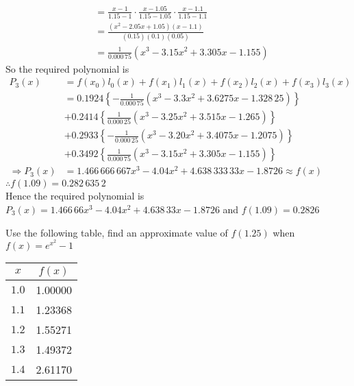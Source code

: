 \documentclass[12pt,class=book,crop=false]{standalone}
\begin{document}
\begin{soln}
\begin{align*}
               & = \frac{x-1}{1.15-1}\cdot\frac{x-1.05}{1.15-1.05}\cdot\frac{x-1.1}{1.15-1.1} \\
               & = \frac{(x^2-2.05x+1.05)(x-1.1)}{(0.15)(0.1)(0.05)}                          \\
               & = \frac{1}{0.000\,75}(x^3-3.15x^2+3.305x-1.155)
    \end{align*}
    So the required polynomial is
    \begin{align*}
        P_3(x)             & = f(x_0)l_0(x)+f(x_1)l_1(x)+f(x_2)l_2(x)+f(x_3)l_3(x)                            \\
                           & = 0.1924\left\{-\frac{1}{0.000\,75}\left(x^3-3.3x^2+3.6275x-1.328\,25\right)\right\} \\
                           & + 0.2414\left\{\frac{1}{0.000\,25}\left(x^3-3.25x^2+3.515x-1.265\right)\right\}    \\
                           & + 0.2933\left\{-\frac{1}{0.000\,25}\left(x^3-3.20x^2+3.4075x-1.2075\right)\right\} \\
                           & + 0.3492\left\{\frac{1}{0.000\,75}\left(x^3-3.15x^2+3.305x-1.155\right)\right\}    \\
        \Rightarrow P_3(x) & = 1.466\,666\,667x^3-4.04x^2+4.638\,333\,33x-1.8726\approx f(x)
    \end{align*}
    \(  \therefore f(1.09)=0.282\,635\,2 \)\\
    Hence the required polynomial is \(  P_3(x) = 1.466\,66x^3-4.04x^2+4.638\,33x-1.8726 \) and \(  f(1.09)=0.2826 \)
\end{soln}
\begin{prob}
    Use the following table, find an approximate value of \(  f(1.25) \) when \(  f(x)=e^{x^2}-1 \)
    \begin{center}
        \begin{tabular}{cS[table-format=3.5]}
            \toprule
            \(  x \)   &     \\\midrule
            \(  1.0 \) &  1.00000  \\
            \(  1.1 \) &  1.23368  \\
            \(  1.2 \) &  1.55271  \\
            \(  1.3 \) &  1.49372  \\
            \(  1.4 \) &  2.61170  \\\bottomrule
        \end{tabular}
    \end{center}
\end{prob}
\end{document}
